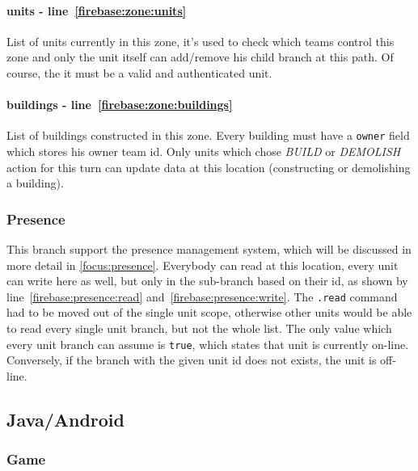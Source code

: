 				\paragraph{units - line~\ref{firebase:zone:units}}
				List of units currently in this zone, it's used to check which teams control this zone and only the unit itself can add/remove his child branch at this path. Of course, the it must be a valid and authenticated unit.
				
				\paragraph{buildings - line~\ref{firebase:zone:buildings}}
				List of buildings constructed in this zone. Every building must have a \lstinline|owner| field which stores his owner team id. Only units which chose \emph{BUILD} or \emph{DEMOLISH} action for this turn can update data at this location (constructing or demolishing a building).
			
			\subsubsection{Presence}\label{model:presence}
		
				
									
				This branch support the presence management system, which will be discussed in more detail in \autoref{focus:presence}.
				Everybody can read at this location, every unit can write here as well, but only in the sub-branch based on their id, as shown by line~\ref{firebase:presence:read} and~\ref{firebase:presence:write}.
				The \lstinline|.read| command had to be moved out of the single unit scope, otherwise other units would be able to read every single unit branch, but not the whole list.
				The only value which every unit branch can assume is \lstinline|true|, which states that unit is currently on-line. Conversely, if the branch with the given unit id does not exists, the unit is off-line.
			
		\subsection{Java/Android}
		
			\subsubsection{Game}
		
